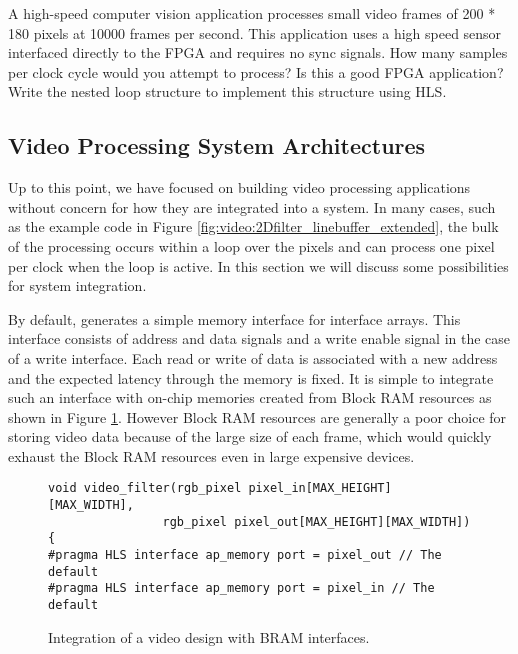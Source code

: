 \begin{exercise}
A high-speed computer vision application processes small video frames of 200 * 180 pixels at 10000 frames per second.  This application uses a high speed sensor interfaced directly to the FPGA and requires no sync signals.  How many samples per clock cycle would you attempt to process?  Is this a good FPGA application?  Write the nested loop structure to implement this structure using HLS.  
\end{exercise}

\subsection{Video Processing System Architectures}
\label{sec:video:architectures}
Up to this point, we have focused on building video processing applications without concern for how they are integrated into a system.  In many cases, such as the example code in Figure \ref{fig:video:2Dfilter_linebuffer_extended}, the bulk of the processing occurs within a loop over the pixels and can process one pixel per clock when the loop is active.  In this section we will discuss some possibilities for system integration.

By default, \VHLS generates a simple memory interface for interface arrays.  This interface consists of address and data signals and a write enable signal in the case of a write interface.  Each read or write of data is associated with a new address and the expected latency through the memory is fixed.  It is simple to integrate such an interface with on-chip memories created from Block RAM resources as shown in Figure \ref{fig:video:BRAM_interface}.  However Block RAM resources are generally a poor choice for storing video data because of the large size of each frame, which would quickly exhaust the Block RAM resources even in large expensive devices.

\begin{figure}
\centering
\framebox{}
\begin{lstlisting}
void video_filter(rgb_pixel pixel_in[MAX_HEIGHT][MAX_WIDTH],
				rgb_pixel pixel_out[MAX_HEIGHT][MAX_WIDTH]) {
#pragma HLS interface ap_memory port = pixel_out // The default
#pragma HLS interface ap_memory port = pixel_in // The default
\end{lstlisting}
\caption{Integration of a video design with BRAM interfaces.}\label{fig:video:BRAM_interface}
\end{figure}


